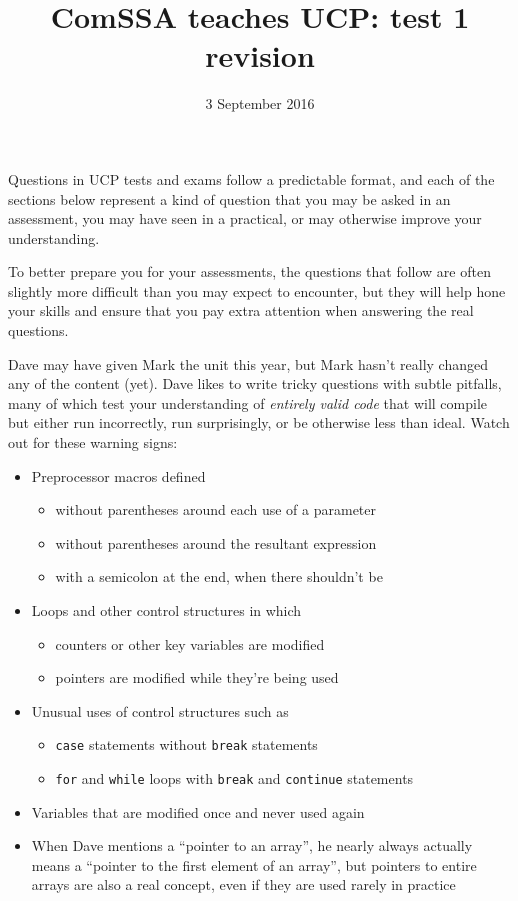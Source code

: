 \documentclass[a4paper,12pt]{article}
\title{ComSSA teaches UCP: test 1 revision}
\date{3 September 2016}
\begin{document}
\maketitle

Questions in UCP tests and exams follow a predictable format, and each
of the sections below represent a kind of question that you may be
asked in an assessment, you may have seen in a practical, or may
otherwise improve your understanding.

To better prepare you for your assessments, the questions that follow
are often slightly more difficult than you may expect to encounter, but
they will help hone your skills and ensure that you pay extra attention
when answering the real questions.

Dave may have given Mark the unit this year, but Mark hasn't really
changed any of the content (yet). Dave likes to write tricky questions
with subtle pitfalls, many of which test your understanding of
\emph{entirely valid code} that will compile but either run
incorrectly, run surprisingly, or be otherwise less than ideal.
Watch out for these warning signs:

\begin{itemize}
	\item Preprocessor macros defined
	\begin{itemize}
		\item without parentheses around each use of a parameter
		\item without parentheses around the resultant expression
		\item with a semicolon at the end, when there shouldn't be
	\end{itemize}
	\item Loops and other control structures in which
	\begin{itemize}
		\item counters or other key variables are modified
		\item pointers are modified while they're being used
	\end{itemize}
	\item Unusual uses of control structures such as
	\begin{itemize}
		\item \texttt{case} statements without
		      \texttt{break} statements
		\item \texttt{for} and \texttt{while} loops with
		      \texttt{break} and \texttt{continue} statements
	\end{itemize}
	\item Variables that are modified once and never used again
	\item When Dave mentions a ``pointer to an array'', he nearly
	      always actually means a ``pointer to the first element of
	      an array'', but pointers to entire arrays are also a
	      real concept, even if they are used rarely in practice
\end{itemize}
\end{document}
